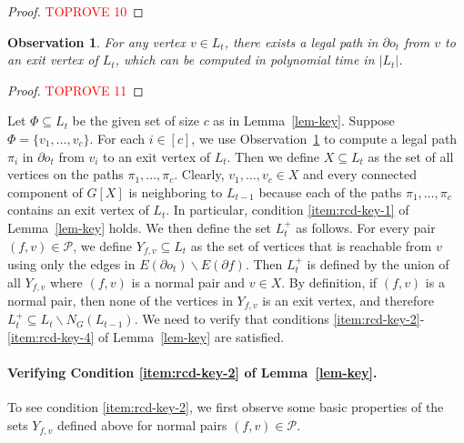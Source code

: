 \documentclass[a4paper,11pt]{article}
\numberwithin{lemma}{section}
\newtheorem{observation}[lemma]{Observation}
\begin{document}
\begin{proof}\textcolor{red}{TOPROVE 10}\end{proof}

\begin{observation}\label{obs-wbpath}
For any vertex $v \in L_t$, there exists a legal path in $\partial o_t$ from $v$ to an exit vertex of $L_t$, which can be computed in polynomial time in $|L_t|$.
\end{observation}
\begin{proof}\textcolor{red}{TOPROVE 11}\end{proof}

Let $\varPhi \subseteq L_t$ be the given set of size $c$ as in Lemma~\ref{lem-key}.
Suppose $\varPhi = \{v_1,\dots,v_c\}$.
For each $i \in [c]$, we use Observation~\ref{obs-wbpath} to compute a legal path $\pi_i$ in $\partial o_t$ from $v_i$ to an exit vertex of $L_t$.
Then we define $X \subseteq L_t$ as the set of all vertices on the paths $\pi_1,\dots,\pi_c$.
Clearly, $v_1,\dots,v_c \in X$ and every connected component of $G[X]$ is neighboring to $L_{t-1}$ because each of the paths $\pi_1,\dots,\pi_c$ contains an exit vertex of $L_t$.
In particular, condition \ref{item:rcd-key-1} of Lemma~\ref{lem-key} holds.
We then define the set $L_t^+$ as follows.
For every pair $(f,v) \in \mathcal{P}$, we define $Y_{f,v} \subseteq L_t$ as the set of vertices that is reachable from $v$ using only the edges in $E(\partial o_t) \backslash E(\partial f)$.
Then $L_t^+$ is defined by the union of all $Y_{f,v}$ where $(f,v)$ is a normal pair and $v \in X$.
By definition, if $(f,v)$ is a normal pair, then none of the vertices in $Y_{f,v}$ is an exit vertex, and therefore $L_t^+ \subseteq L_t \backslash N_G(L_{t-1})$.
We need to verify that conditions \ref{item:rcd-key-2}-\ref{item:rcd-key-4} of Lemma~\ref{lem-key} are satisfied.

\paragraph{Verifying Condition \ref{item:rcd-key-2} of Lemma~\ref{lem-key}.}
To see condition \ref{item:rcd-key-2}, we first observe some basic properties of the sets $Y_{f,v}$ defined above for normal pairs $(f,v) \in \mathcal{P}$.
\end{document}
